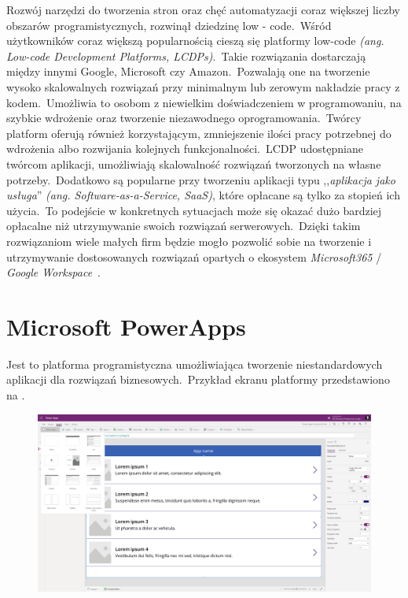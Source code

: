 Rozwój narzędzi do tworzenia stron oraz chęć automatyzacji coraz większej liczby obszarów programistycznych, rozwinął dziedzinę low - code.\ Wśród użytkowników coraz większą popularnością cieszą się platformy low-code \textit{(ang. Low-code Development Platforms, LCDPs)}.\ Takie rozwiązania dostarczają między innymi Google, Microsoft czy Amazon.\ Pozwalają one na tworzenie wysoko skalowalnych rozwiązań przy minimalnym lub zerowym nakładzie pracy z kodem.\ Umożliwia to osobom z niewielkim doświadczeniem w programowaniu, na szybkie wdrożenie oraz tworzenie niezawodnego oprogramowania.\ Twórcy platform oferują również korzystającym, zmniejszenie ilości pracy potrzebnej do wdrożenia albo rozwijania kolejnych funkcjonalności.\ LCDP udostępniane twórcom aplikacji, umożliwiają skalowalność rozwiązań tworzonych na własne potrzeby.\ Dodatkowo są popularne przy tworzeniu aplikacji typu ,,\textit{aplikacja jako usługa}'' \textit{(ang. Software-as-a-Service, SaaS)}, które opłacane są tylko za stopień ich użycia.\ To podejście w konkretnych sytuacjach może się okazać dużo bardziej opłacalne niż utrzymywanie swoich rozwiązań serwerowych.\ Dzięki takim rozwiązaniom wiele małych firm będzie mogło pozwolić sobie na tworzenie i utrzymywanie dostosowanych rozwiązań opartych o ekosystem \textit{Microsoft365} / \textit{Google Workspace}~\cite{Bock2021,Hirzel2022}.


\section{Microsoft PowerApps}
Jest to platforma programistyczna umożliwiająca tworzenie niestandardowych aplikacji dla rozwiązań biznesowych.\ Przykład ekranu platformy przedstawiono na .

\begin{figure}[H]
    \centering
    \includegraphics[width=\textwidth]{images/ms_powerapps}
    \label{fig:pa-plat}
\end{figure}


